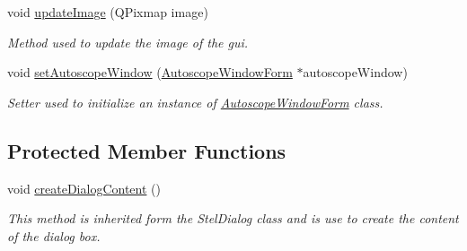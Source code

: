 \begin{DoxyCompactItemize}
void \hyperlink{class_autoscope_picture_window_form_ac5673825fbee28ceaa21d962b92fbd42}{update\+Image} (Q\+Pixmap image)
\begin{DoxyCompactList}\small\item\em Method used to update the image of the gui. \end{DoxyCompactList}\item 
void \hyperlink{class_autoscope_picture_window_form_a14928e7fe4954367986932b7439fa132}{set\+Autoscope\+Window} (\hyperlink{class_autoscope_window_form}{Autoscope\+Window\+Form} $\ast$autoscope\+Window)
\begin{DoxyCompactList}\small\item\em Setter used to initialize an instance of \hyperlink{class_autoscope_window_form}{Autoscope\+Window\+Form} class. \end{DoxyCompactList}\end{DoxyCompactItemize}
\subsection*{Protected Member Functions}
\begin{DoxyCompactItemize}
\item 
void \hyperlink{class_autoscope_picture_window_form_a3014c48f6c7e48455f8908ca3f9acbbc}{create\+Dialog\+Content} ()
\begin{DoxyCompactList}\small\item\em This method is inherited form the Stel\+Dialog class and is use to create the content of the dialog box. \end{DoxyCompactList}\end{DoxyCompactItemize}
